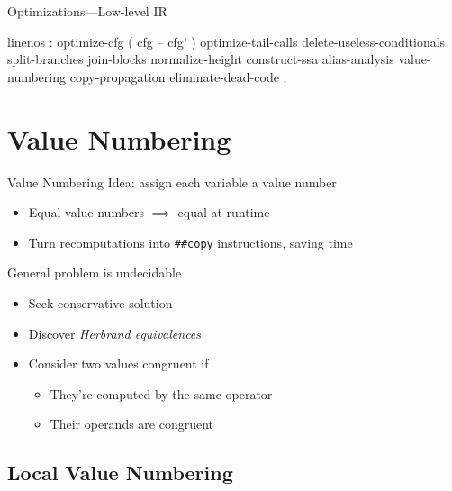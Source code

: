 \documentclass{beamer}
\begin{document}
\begin{frame}[fragile]{Optimizations---Low-level IR}
  \renewcommand{\theFancyVerbLine}{%
    \ifnum\value{FancyVerbLine}=9%
    $\longrightarrow$\else{}\fi}
  \begin{center}
  \begin{minipage}{0.5\linewidth}
  \begin{factorcode*}{linenos}
: optimize-cfg ( cfg -- cfg' )
    optimize-tail-calls
    delete-useless-conditionals
    split-branches
    join-blocks
    normalize-height
    construct-ssa
    alias-analysis
    value-numbering
    copy-propagation
    eliminate-dead-code ;
  \end{factorcode*}
  \end{minipage}
  \end{center}
\end{frame}

\section{Value Numbering}

\begin{frame}{Value Numbering}
  Idea: assign each variable a \alert{value number}
  \begin{itemize}
    \item Equal value numbers $\implies$ equal at runtime
    \item Turn recomputations into \texttt{\#\#copy} instructions, saving time
  \end{itemize}

  General problem is undecidable
  \begin{itemize}
    \item Seek \alert{conservative} solution
    \item Discover \emph{Herbrand equivalences}
    \item Consider two values \alert{congruent} if
    \begin{itemize}
      \item They're computed by the same operator
      \item Their operands are congruent
    \end{itemize}
  \end{itemize}
\end{frame}

\subsection{Local Value Numbering}
\end{document}
